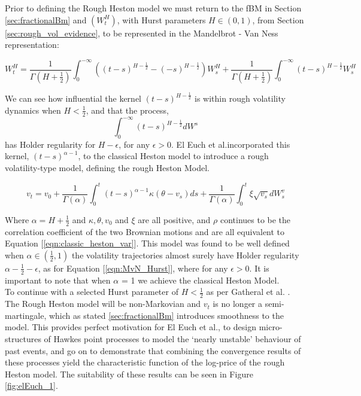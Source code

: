 \documentclass[12pt,oneside]{article}
\begin{document}
Prior to defining the Rough Heston model we must return to the fBM in Section \ref{sec:fractionalBm} and $(\textit{$W^H_t$})$, with Hurst parameters $\textit{H} \in (0,1)$, from Section  \ref{sec:rough_vol_evidence}, to be represented in the Mandelbrot - Van Ness representation:

\begin{equation}
\label{eqn:MvN_Hurst}
{W^H_t} = \frac{1}{\Gamma(H + \frac{1}{2})} \int_{0}^{-\infty} ((t-s)^{H-\frac{1}{2}} - (-s)^{H - \frac{1}{2}})W^H_s + \frac{1}{\Gamma(H + \frac{1}{2})} \int_{0}^{-\infty} (t-s)^{H-\frac{1}{2}}W^H_s
\end{equation}


We can see how influential  the kernel  $(t-s)^{H-\frac{1}{2}}$ is within rough volatility dynamics when $H<\frac{1}{2}$, and that the process,
$$\int_{0}^{-\infty} (t-s)^{H-\frac{1}{2}} dW^s$$
has Holder regularity for $H - \epsilon$, for any $\epsilon>0$. El Euch et al.incorporated this kernel, $(t-s)^{\alpha-1}$, to the classical Heston model to introduce a rough volatility-type model, defining the rough Heston Model.

\begin{equation}
\label{eqn:rough_heston}
v_t = v_0 + \frac{1}{\Gamma(\alpha)} \int_{0}^{t} (t-s)^{\alpha-1} \kappa (\theta - v_s)ds + \frac{1}{\Gamma(\alpha)} \int_{0}^{t} \xi\sqrt{v_s}dW_s^{v}
\end{equation}


Where $\alpha = H+\frac{1}{2}$ and $\kappa, \theta, v_0$ and $\xi$ are all positive, and $\rho$ continues to be the correlation coefficient of the two Brownian motions and are all equivalent to Equation [\ref{eqn:classic_heston_var}]. This model was found to be well defined when ${\alpha} \in (\frac{1}{2},1)$ the volatility trajectories almost surely have Holder regularity $\alpha - \frac{1}{2} -\epsilon$, as for Equation [\ref{eqn:MvN_Hurst}], where for any $\epsilon>0$. It is important to note that when $\alpha$ = 1 we achieve the classical Heston Model.
\\

To continue with a selected Hurst parameter of $H < \frac{1}{2}$ as per Gatheral et al. \cite{Gatheral2014}. The Rough Heston model will be non-Markovian and $v_t$ is no longer a semi-martingale, which as stated \ref{sec:fractionalBm} introduces smoothness to the model. This provides perfect motivation for El Euch et al., to design micro-structures of Hawkes point processes to model the `nearly unstable' behaviour of past events, and go on to demonstrate that combining the convergence results of these processes yield the characteristic function of the log-price of the rough Heston model. The suitability of these results can be seen in Figure \ref{fig:elEuch_1}.
\\
\end{document}
